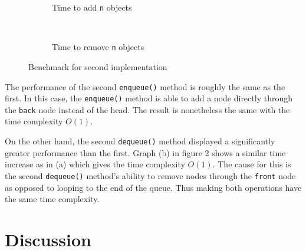 \documentclass[a4paper,11pt]{article}
\begin{document}
\begin{figure*}[ht!]
  \centering
  \begin{subfigure}[t]{0.47\textwidth}
    \caption{Time to add {\tt n} objects}
    \label{fig:subplot3}
  \end{subfigure}
  ~
  \begin{subfigure}[t]{0.5\textwidth}
    \caption{Time to remove {\tt n} objects}
    \label{fig:subplot4}
  \end{subfigure}
  \caption{Benchmark for second implementation}
  \label{fig:plot2}
\end{figure*}

The performance of the second {\tt enqueue()} method is roughly the 
same as the first. In this case, the {\tt enqueue()} method is able 
to add a node directly through the {\tt back} node instead of the head.
The result is nonetheless the same with the time complexity $ O(1)$.

On the other hand, the second {\tt dequeue()} method displayed a 
significantly greater performance than the first. Graph (b) in figure 2
shows a similar time increase as in (a) which gives the time complexity 
$ O(1)$. The cause for this is the second {\tt dequeue()} method's
ability to remove nodes through the {\tt front} node as opposed to
looping to the end of the queue. Thus making both operations have the
same time complexity.

\section*{Discussion}
\end{document}
